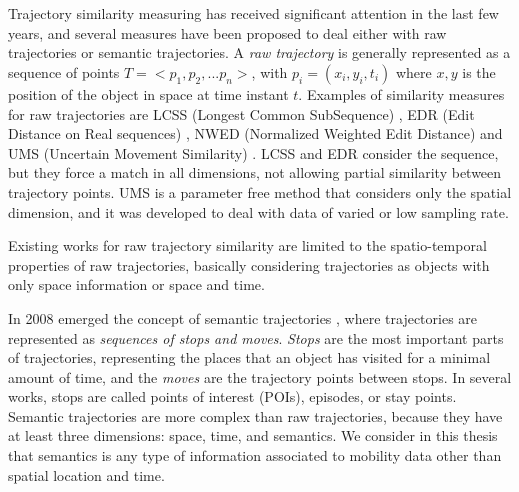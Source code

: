 \chapter{}
Trajectory similarity measuring has received significant attention in the last few years, and several measures have been proposed {to deal either with raw trajectories or semantic trajectories}. A \emph{raw trajectory} is generally represented as a sequence of points $T=<p_1, p_2, ...p_n>$, with $p_i=(x_i,y_i,t_i)$ where $x,y$ is the position of the object in space at time instant $t$.  Examples of similarity measures for raw trajectories are LCSS (Longest Common SubSequence) \cite{vlachos2002discovering}, EDR (Edit Distance on Real sequences) \cite{Chen:2005:RFS:1066157.1066213}, NWED (Normalized Weighted Edit Distance) \cite{dodge2012} and UMS (Uncertain Movement Similarity) \cite{Furtado-UMS-2018}. LCSS and EDR consider the sequence, but they force a match in all dimensions, not allowing partial similarity between trajectory points.
UMS is a parameter free method that considers only the spatial dimension, and it was developed to deal with data of varied or low sampling rate.


Existing works for raw trajectory similarity are limited to the spatio-temporal properties of raw trajectories, basically considering trajectories as objects with only space information or space and time.

In 2008 emerged the concept of semantic trajectories \cite{Spaccapietra:2008:CVT:1347466.1347785}, where trajectories are represented as \emph{sequences of stops and moves}. \emph{Stops} are the most important parts of trajectories, representing the places that an object has visited for a minimal amount of time, and the \emph{moves} are the trajectory points between stops. In several works, stops are called points of interest (POIs), episodes, or stay points. Semantic trajectories are more complex than raw trajectories, because they have at least three dimensions: space, time, and semantics. {We consider in this thesis that semantics is any type of information associated to mobility data other than spatial location and time.}

